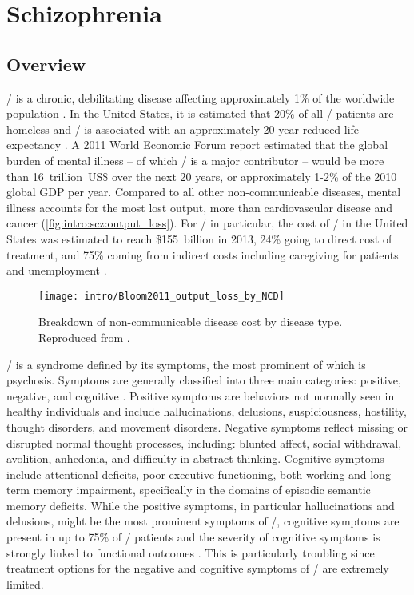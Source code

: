 \acresetall
\chapter{Schizophrenia}
\label{ch:intro:scz}
\section*{Overview}
\Scz/ is a chronic, debilitating disease affecting approximately 1\% of the worldwide population \citep{McGrath2008}.
In the United States, it is estimated that 20\% of all \scz/ patients are homeless and \scz/ is associated with an approximately 20 year reduced life expectancy \citep{Folsom2005, Tiihonen2009}.
A 2011 World Economic Forum report \citep{Bloom2011} estimated that the global burden of mental illness -- of which \scz/ is a major contributor -- would be more than 16~trillion~US\$ over the next 20 years, or approximately 1-2\% of the 2010 global GDP per year.
Compared to all other non-communicable diseases, mental illness accounts for the most lost output, more than cardiovascular disease and cancer (\autoref{fig:intro:scz:output_loss}).
For \scz/ in particular, the cost of \scz/ in the United States was estimated to reach \$155~billion in 2013, 24\% going to direct cost of treatment, and 75\% coming from indirect costs including caregiving for patients and unemployment \citep{Cloutier2016}. 
\begin{figure}
	\centering
	\texttt{[image: intro/Bloom2011\_output\_loss\_by\_NCD]}
	\caption[Breakdown of non-communicable disease cost by disease type]{Breakdown of non-communicable disease cost by disease type. Reproduced from \citet{Bloom2011}.}
	\label{fig:intro:scz:output_loss}
\end{figure}

\Scz/ is a syndrome defined by its symptoms, the most prominent of which is psychosis.
Symptoms are generally classified into three main categories: positive, negative, and cognitive \citep{Kay1982}.
Positive symptoms are behaviors not normally seen in healthy individuals and include hallucinations, delusions, suspiciousness, hostility, thought disorders, and movement disorders.
Negative symptoms reflect missing or disrupted normal thought processes, including: blunted affect, social withdrawal, avolition, anhedonia, and difficulty in abstract thinking.
Cognitive symptoms include attentional deficits, poor executive functioning, both working and long-term memory impairment, specifically in the domains of episodic semantic memory deficits.
While the positive symptoms, in particular hallucinations and delusions, might be the most prominent symptoms of \scz/, cognitive symptoms are present in up to 75\% of \scz/ patients and the severity of cognitive symptoms is strongly linked to functional outcomes \citep{O'Carroll2000, Green1996, Keefe2007}.
This is particularly troubling since treatment options for the negative and cognitive symptoms of \scz/ are extremely limited.

